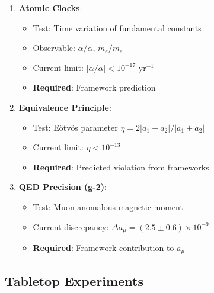 \begin{enumerate}
    \item \textbf{Atomic Clocks}:
    \begin{itemize}
        \item Test: Time variation of fundamental constants
        \item Observable: $\dot{\alpha}/\alpha$, $\dot{m}_e/m_e$
        \item Current limit: $|\dot{\alpha}/\alpha| < 10^{-17}$ yr$^{-1}$
        \item \textbf{Required}: Framework prediction
    \end{itemize}

    \item \textbf{Equivalence Principle}:
    \begin{itemize}
        \item Test: E\"otv\"os parameter $\eta = 2|a_1 - a_2|/|a_1 + a_2|$
        \item Current limit: $\eta < 10^{-13}$
        \item \textbf{Required}: Predicted violation from frameworks
    \end{itemize}

    \item \textbf{QED Precision (g-2)}:
    \begin{itemize}
        \item Test: Muon anomalous magnetic moment
        \item Current discrepancy: $\Delta a_\mu = (2.5 \pm 0.6) \times 10^{-9}$
        \item \textbf{Required}: Framework contribution to $a_\mu$
    \end{itemize}
\end{enumerate}

\subsection{Tabletop Experiments}

